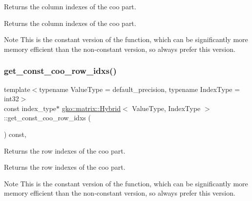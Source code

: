 Returns the column indexes of the coo part. 

\begin{DoxyReturn}{Returns}
the column indexes of the coo part.
\end{DoxyReturn}
\begin{DoxyNote}{Note}
This is the constant version of the function, which can be significantly more memory efficient than the non-\/constant version, so always prefer this version. 
\end{DoxyNote}
\mbox{\label{classgko_1_1matrix_1_1Hybrid_ae0d4b0c9151011ef879055f504f79f63}} 
\subsubsection{\texorpdfstring{get\+\_\+const\+\_\+coo\+\_\+row\+\_\+idxs()}{get\_const\_coo\_row\_idxs()}}
{\footnotesize\ttfamily template$<$typename Value\+Type = default\+\_\+precision, typename Index\+Type = int32$>$ \\
const index\+\_\+type$\ast$ \hyperlink{classgko_1_1matrix_1_1Hybrid}{gko\+::matrix\+::\+Hybrid}$<$ Value\+Type, Index\+Type $>$\+::get\+\_\+const\+\_\+coo\+\_\+row\+\_\+idxs (\begin{DoxyParamCaption}{ }\end{DoxyParamCaption}) const\hspace{0.3cm}{\ttfamily [inline]}, {\ttfamily [noexcept]}}



Returns the row indexes of the coo part. 

\begin{DoxyReturn}{Returns}
the row indexes of the coo part.
\end{DoxyReturn}
\begin{DoxyNote}{Note}
This is the constant version of the function, which can be significantly more memory efficient than the non-\/constant version, so always prefer this version. 
\end{DoxyNote}
\mbox{\label{classgko_1_1matrix_1_1Hybrid_a9b066402b6f3727196c9945a80f08a6e}} 
